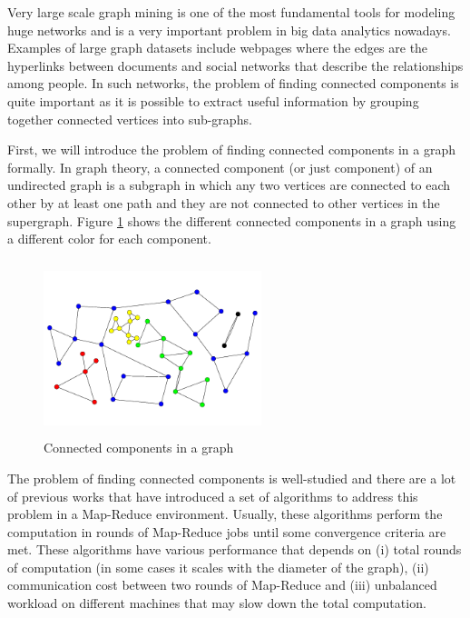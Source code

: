 Very large scale graph mining is one of the most fundamental tools for modeling huge networks and is a very important problem in big data analytics nowadays. Examples of large graph datasets include webpages where the edges are the hyperlinks between documents and social networks that describe the relationships among people. In such networks, the problem of finding connected components is quite important as it is possible to extract useful information by grouping together connected vertices into sub-graphs.

First, we will introduce the problem of finding connected components in a graph formally. In graph theory, a connected component (or just component) of an undirected graph is a subgraph in which any two vertices are connected to each other by at least one path and they are not connected to other vertices in the supergraph. Figure \ref{figure:connected} shows the different connected components in a graph using a different color for each component.

\begin{figure}[!h]
 \centering
    \includegraphics[height=12pc,width=15pc]{figures/connected_components.png}
	\caption{Connected components in a graph}
    \label{figure:connected}
\end{figure}

The problem of finding connected components is well-studied and there are a lot of previous works that have introduced a set of algorithms to address this problem in a Map-Reduce \cite{mapreduce} environment. Usually, these algorithms perform the computation in rounds of Map-Reduce jobs until some convergence criteria are met. These algorithms have various performance that depends on (i) total rounds of computation (in some cases it scales with the diameter of the graph), (ii) communication cost between two rounds of Map-Reduce and (iii) unbalanced workload on different machines that may slow down the total computation.

